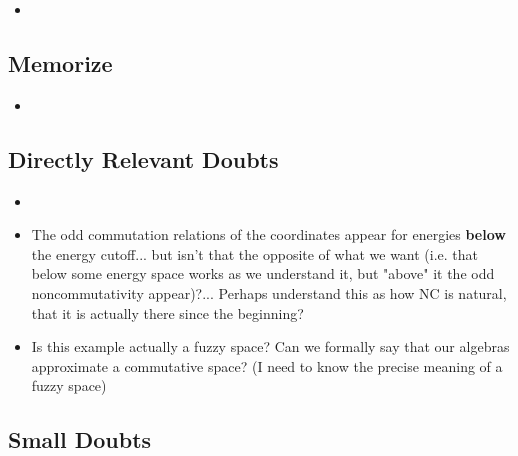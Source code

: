 \documentclass{article}
\begin{document}
    \begin{itemize}

    \item 
    
    \end{itemize}

\subsection*{Memorize}

    \begin{itemize}

    \item 
    
    \end{itemize}

\subsection*{Directly Relevant Doubts}

    \begin{itemize}

    \item{}
    
    \item The odd commutation relations of the coordinates appear for energies \textbf{below} the energy cutoff... but isn't that the opposite of what we want (i.e. that below some energy space works as we understand it, but "above" it the odd noncommutativity appear)?... Perhaps understand this as how NC is natural, that it is actually there since the beginning?
    
    \item Is this example actually a fuzzy space? Can we formally say that our algebras approximate a commutative space? (I need to know the precise meaning of a fuzzy space)
    
    \end{itemize}
    
\subsection*{Small Doubts}
\end{document}
